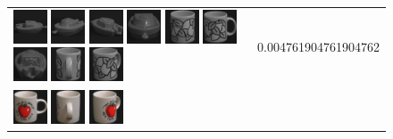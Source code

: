 \begin{figure}[!bp]
\begin{tabular}{m{11cm} | m{3cm} |}
\includegraphics[width=1cm]{coil/beeld-25.eps}
\includegraphics[width=1cm]{coil/beeld-27.eps}
\includegraphics[width=1cm]{coil/beeld-28.eps}
\includegraphics[width=1cm]{coil/beeld-26.eps}
\includegraphics[width=1cm]{coil/beeld-50.eps}
\includegraphics[width=1cm]{coil/beeld-48.eps}
\includegraphics[width=1cm]{coil/beeld-29.eps}
\includegraphics[width=1cm]{coil/beeld-53.eps}
\includegraphics[width=1cm]{coil/beeld-51.eps}
& {\scriptsize 0.004761904761904762}
\\
\includegraphics[width=1cm]{coil/beeld-36.eps}
\includegraphics[width=1cm]{coil/beeld-41.eps}
\includegraphics[width=1cm]{coil/beeld-39.eps}

\end{tabular}
\end{figure}
